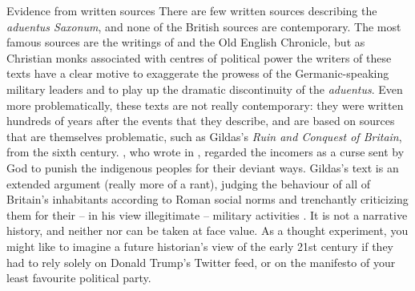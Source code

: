 \begin{sourcebox}{Evidence from written sources}
There are few written sources describing the \emph{aduentus Saxonum}, and none of the British sources are contemporary. The most famous sources are the writings of  and the Old English Chronicle, but as Christian monks associated with centres of political power the writers of these texts have a clear motive to exaggerate the prowess of the Germanic-speaking military leaders and to play up the dramatic discontinuity of the \emph{aduentus}. Even more problematically, these texts are not really contemporary: they were written hundreds of years after the events that they describe, and are based on sources that are themselves problematic, such as Gildas's \emph{Ruin and Conquest of Britain}, from the sixth century. , who wrote in , regarded the incomers as a curse sent by God to punish the indigenous peoples for their deviant ways. Gildas's text is an extended argument (really more of a rant), judging the behaviour of all of Britain's inhabitants according to Roman social norms and trenchantly criticizing them for their -- in his view illegitimate -- military activities \citep{Harland2017}. It is not a narrative history, and neither  nor  can be taken at face value. As a thought experiment, you might like to imagine a future historian's view of the early 21st century if they had to rely solely on Donald Trump's Twitter feed, or on the manifesto of your least favourite political party.
\end{sourcebox}


